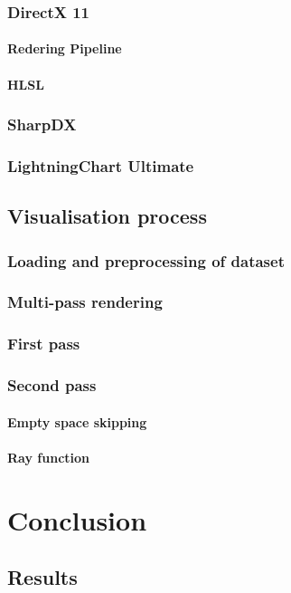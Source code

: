 \documentclass[twoside, english, 11pt]{report}
\begin{document}
\subsection{DirectX 11}
\subsubsection{Redering Pipeline}
\subsubsection{HLSL}
\subsection{SharpDX}
\subsection{LightningChart Ultimate}
\section{Visualisation process}
\subsection{Loading and preprocessing of dataset}
\subsection{Multi-pass rendering}
\subsection{First pass}
\subsection{Second pass}
\subsubsection{Empty space skipping}
\subsubsection{Ray function}

\chapter{Conclusion}
\section{Results}
\end{document}
